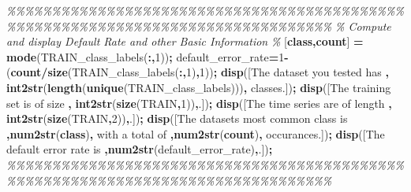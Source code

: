 \documentclass[
]{book}
\newenvironment{Shaded}{\begin{snugshade}}{\end{snugshade}}
\newcommand{\CommentTok}[1]{\textcolor[rgb]{0.56,0.35,0.01}{\textit{#1}}}
\newcommand{\FloatTok}[1]{\textcolor[rgb]{0.00,0.00,0.81}{#1}}
\newcommand{\FunctionTok}[1]{\textcolor[rgb]{0.13,0.29,0.53}{\textbf{#1}}}
\newcommand{\NormalTok}[1]{#1}
\newcommand{\OperatorTok}[1]{\textcolor[rgb]{0.81,0.36,0.00}{\textbf{#1}}}
\newcommand{\StringTok}[1]{\textcolor[rgb]{0.31,0.60,0.02}{#1}}
\begin{document}
\begin{Shaded}
\begin{Highlighting}[]
\CommentTok{\%\%\%\%\%\%\%\%\%\%\%\%\%\%\%\%\%\%\%\%\%\%\%\%\%\%\%\%\%\%\%\%\%\%\%\%\%\%\%\%\%\%\%\%\%\%\%\%\%\%\%\%\%\%\%\%\%\%\%\%\%\%\%\%\%\%\%\%\%\%\%\%\%\%\%\%\%\%\%\%}
\CommentTok{\% Compute and display Default Rate and other Basic Information}
\CommentTok{\%}
\NormalTok{[}\FunctionTok{class}\OperatorTok{,}\FunctionTok{count}\NormalTok{] }\OperatorTok{=} \FunctionTok{mode}\NormalTok{(TRAIN\_class\_labels(}\OperatorTok{:,}\FloatTok{1}\NormalTok{))}\OperatorTok{;}
\NormalTok{default\_error\_rate}\OperatorTok{=}\FloatTok{1}\OperatorTok{{-}}\NormalTok{(}\FunctionTok{count}\OperatorTok{/}\FunctionTok{size}\NormalTok{(TRAIN\_class\_labels(}\OperatorTok{:,}\FloatTok{1}\NormalTok{)}\OperatorTok{,}\FloatTok{1}\NormalTok{))}\OperatorTok{;}
\FunctionTok{disp}\NormalTok{([}\StringTok{\textquotesingle{}The dataset you tested has \textquotesingle{}}\OperatorTok{,} \FunctionTok{int2str}\NormalTok{(}\FunctionTok{length}\NormalTok{(}\FunctionTok{unique}\NormalTok{(TRAIN\_class\_labels)))}\OperatorTok{,} \StringTok{\textquotesingle{} classes.\textquotesingle{}}\NormalTok{])}\OperatorTok{;}
\FunctionTok{disp}\NormalTok{([}\StringTok{\textquotesingle{}The training set is of size \textquotesingle{}}\OperatorTok{,} \FunctionTok{int2str}\NormalTok{(}\FunctionTok{size}\NormalTok{(TRAIN}\OperatorTok{,}\FloatTok{1}\NormalTok{))}\OperatorTok{,}\StringTok{\textquotesingle{}.\textquotesingle{}}\NormalTok{])}\OperatorTok{;}
\FunctionTok{disp}\NormalTok{([}\StringTok{\textquotesingle{}The time series are of length \textquotesingle{}}\OperatorTok{,} \FunctionTok{int2str}\NormalTok{(}\FunctionTok{size}\NormalTok{(TRAIN}\OperatorTok{,}\FloatTok{2}\NormalTok{))}\OperatorTok{,}\StringTok{\textquotesingle{}.\textquotesingle{}}\NormalTok{])}\OperatorTok{;}
\FunctionTok{disp}\NormalTok{([}\StringTok{\textquotesingle{}The dataset\textquotesingle{}\textquotesingle{}s most common class is \textquotesingle{}}\OperatorTok{,}\FunctionTok{num2str}\NormalTok{(}\FunctionTok{class}\NormalTok{)}\OperatorTok{,}\StringTok{\textquotesingle{} with a total of \textquotesingle{}}\OperatorTok{,}\FunctionTok{num2str}\NormalTok{(}\FunctionTok{count}\NormalTok{)}\OperatorTok{,}\StringTok{\textquotesingle{} occurances.\textquotesingle{}}\NormalTok{])}\OperatorTok{;}
\FunctionTok{disp}\NormalTok{([}\StringTok{\textquotesingle{}The default error rate is \textquotesingle{}}\OperatorTok{,}\FunctionTok{num2str}\NormalTok{(default\_error\_rate)}\OperatorTok{,}\StringTok{\textquotesingle{}.\textquotesingle{}}\NormalTok{])}\OperatorTok{;}
\CommentTok{\%\%\%\%\%\%\%\%\%\%\%\%\%\%\%\%\%\%\%\%\%\%\%\%\%\%\%\%\%\%\%\%\%\%\%\%\%\%\%\%\%\%\%\%\%\%\%\%\%\%\%\%\%\%\%\%\%\%\%\%\%\%\%\%\%\%\%\%\%\%\%\%\%\%\%\%\%\%\%\%}


\end{Highlighting}
\end{Shaded}
\end{document}
